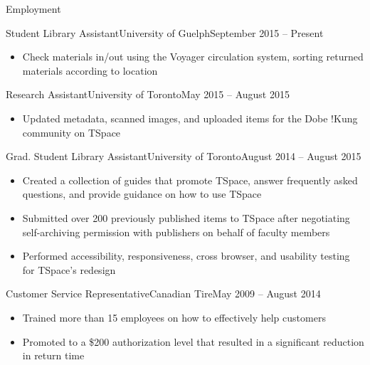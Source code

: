 \documentclass[]{mcdowellcv}
\begin{document}
	\makeheader
	
	\begin{cvsection}{Employment}
		\begin{cvsubsection}{Student Library Assistant}{University of Guelph}{September 2015 -- Present}
			\begin{itemize}
				\item Check materials in/out using the Voyager circulation system, sorting returned materials according to location
			\end{itemize}
		\end{cvsubsection}
		
		\begin{cvsubsection}{Research Assistant}{University of Toronto}{May 2015 -- August 2015}	
			\begin{itemize}
				\item Updated metadata, scanned images, and uploaded items for the Dobe !Kung community on TSpace
			\end{itemize}
		\end{cvsubsection}
		
		\begin{cvsubsection}{Grad. Student Library Assistant}{University of Toronto}{August 2014 -- August 2015}		
			\begin{itemize}
				\item Created a collection of guides that promote TSpace, answer frequently asked questions, and provide guidance on how to use TSpace
                \item Submitted over 200 previously published items to TSpace after negotiating self-archiving permission with publishers on behalf of faculty members
                \item Performed accessibility, responsiveness, cross browser, and usability testing for TSpace's redesign
			\end{itemize}
		\end{cvsubsection}
		
		\begin{cvsubsection}{Customer Service Representative}{Canadian Tire}{May 2009 -- August 2014}
			\begin{itemize}
				\item Trained more than 15 employees on how to effectively help customers
				\item Promoted to a \$200 authorization level that resulted in a significant reduction in return time
			\end{itemize}
		\end{cvsubsection}
	\end{cvsection}
	
\end{document}
